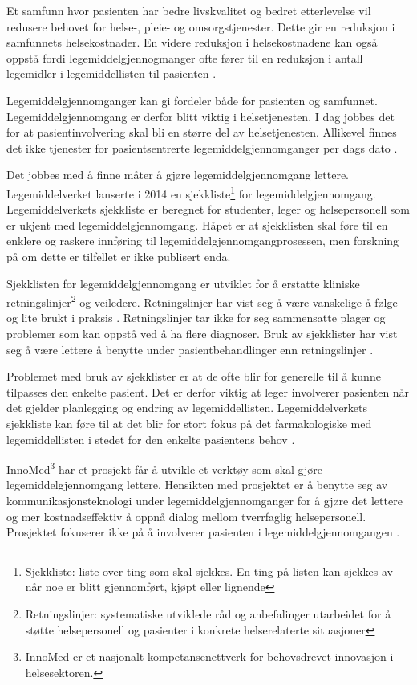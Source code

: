 Et samfunn hvor pasienten har bedre livskvalitet og bedret etterlevelse vil redusere behovet for helse-, pleie- og omsorgstjenester. Dette gir en reduksjon i samfunnets helsekostnader. En videre reduksjon i helsekostnadene kan også oppstå fordi legemiddelgjennogmanger ofte fører til en reduksjon i antall legemidler i legemiddellisten til pasienten \citep{HealthEconomic}.

Legemiddelgjennomganger kan gi fordeler både for pasienten og samfunnet. Legemiddelgjennomgang er derfor blitt viktig i helsetjenesten. I dag jobbes det for at pasientinvolvering skal bli en større del av helsetjenesten. Allikevel finnes det ikke tjenester for pasientsentrerte legemiddelgjennomganger per dags dato \citep{innoMedForprojekt}. 

Det jobbes med å finne måter å gjøre legemiddelgjennomgang lettere. Legemiddelverket lanserte i 2014 en sjekkliste\footnote{Sjekkliste: liste over ting som skal sjekkes. En ting på listen kan sjekkes av når noe er blitt gjennomført, kjøpt eller lignende} for legemiddelgjennomgang. Legemiddelverkets sjekkliste er beregnet for studenter, leger og helsepersonell som er ukjent med legemiddelgjennomgang. Håpet er at sjekklisten skal føre til en enklere og raskere innføring til legemiddelgjennomgangprosessen, men forskning på om dette er tilfellet er ikke publisert enda. 

Sjekklisten for legemiddelgjennomgang er utviklet for å erstatte kliniske retningslinjer\footnote{Retningslinjer: systematiske utviklede råd og anbefalinger utarbeidet for å støtte helsepersonell og pasienter i konkrete helserelaterte situasjoner} og veiledere. Retningslinjer har vist seg   å være vanskelige å følge og lite brukt i praksis \citep{utposten, 19878542}. Retningslinjer tar ikke for seg sammensatte plager og problemer som kan oppstå ved å ha flere diagnoser. Bruk av sjekklister har vist seg å være lettere å benytte under pasientbehandlinger enn retningslinjer \citep{haugen2014effect, legemiddelgjennomgangTiltak}.

Problemet med bruk av sjekklister er at de ofte blir for generelle til å kunne tilpasses den enkelte pasient. Det er derfor viktig at leger involverer pasienten når det gjelder planlegging og endring av legemiddellisten. Legemiddelverkets sjekkliste kan føre til at det blir for stort fokus på det farmakologiske med legemiddellisten i stedet for den enkelte pasientens behov \citep{legemiddelgjennomgangTiltak}.

InnoMed\footnote{InnoMed er et nasjonalt kompetansenettverk for behovsdrevet innovasjon i helsesektoren.} har et prosjekt får å utvikle et verktøy som skal gjøre legemiddelgjennomgang lettere. Hensikten med prosjektet er å benytte seg av kommunikasjonsteknologi under legemiddelgjennomganger for å gjøre det lettere og mer kostnadseffektiv å oppnå dialog mellom tverrfaglig helsepersonell. Prosjektet fokuserer ikke på å involverer pasienten i legemiddelgjennomgangen \citep{innoMedForprojekt}.  


